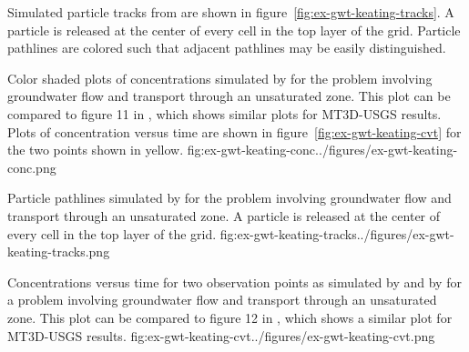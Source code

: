 Simulated particle tracks from \mf are shown in figure~\ref{fig:ex-gwt-keating-tracks}.  A particle is released at the center of every cell in the top layer of the grid.  Particle pathlines are colored such that adjacent pathlines may be easily distinguished.

\begin{StandardFigure}{
                                     Color shaded plots of concentrations simulated by \mf for the \cite{keating2009stable} problem involving groundwater flow and transport through an unsaturated zone.  This plot can be compared to figure 11 in \cite{mt3dusgs}, which shows similar plots for MT3D-USGS results.  Plots of concentration versus time are shown in figure~\ref{fig:ex-gwt-keating-cvt} for the two points shown in yellow.
                                     }{fig:ex-gwt-keating-conc}{../figures/ex-gwt-keating-conc.png}
\end{StandardFigure}                                  

\begin{StandardFigure}{
                                    Particle pathlines simulated by \mf for the \cite{keating2009stable} problem involving groundwater flow and transport through an unsaturated zone.  A particle is released at the center of every cell in the top layer of the grid.
                                    }{fig:ex-gwt-keating-tracks}{../figures/ex-gwt-keating-tracks.png}
\end{StandardFigure}      

\begin{StandardFigure}{
                                     Concentrations versus time for two observation points as simulated by \mf and by \cite{keating2009stable} for a problem involving groundwater flow and transport through an unsaturated zone.  This plot can be compared to figure 12 in \cite{mt3dusgs}, which shows a similar plot for MT3D-USGS results.
                                     }{fig:ex-gwt-keating-cvt}{../figures/ex-gwt-keating-cvt.png}
\end{StandardFigure}                                  
